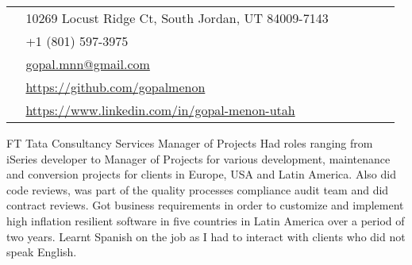 \documentclass[10pt]{article} %
\begin{document}
\begin{paracol}{2}
\switchcolumn %







\parbox[top][0.12\textheight][c]{\linewidth}{ %
	\vspace{-0.04\textheight} %
	\colorbox{shade}{ %
		\begin{supertabular}{p{0.03\linewidth}|p{0.94\linewidth}} %
			\raisebox{-1pt}{\faHome} & 10269 Locust Ridge Ct, South Jordan, UT 84009-7143 \\ %
			\raisebox{-1pt}{\faPhone} & +1 (801) 597-3975 \\ %
			\raisebox{0pt}{\small\faEnvelope} & \href{mailto:gopal.mnn@gmail.com}{gopal.mnn@gmail.com} \\ %
			\raisebox{-1pt}{\small\faDesktop} & \href{https://github.com/gopalmenon}{https://github.com/gopalmenon} \\ %
			\raisebox{-1pt}{\small\faDesktop} & \href{https://www.linkedin.com/in/gopal-menon-utah}{https://www.linkedin.com/in/gopal-menon-utah} \\ %
		\end{supertabular}
	}
}


{FT} %
{Tata Consultancy Services} %
{Manager of Projects} %
{Had roles ranging from iSeries developer to Manager of Projects for various development, maintenance and conversion projects for clients in Europe, USA and Latin America. Also did code reviews, was part of the quality processes compliance audit team and did contract reviews. Got business requirements in order to customize and implement high inflation resilient software in five countries in Latin America over a period of two years. Learnt Spanish on the job as I had to interact with clients who did not speak English.}  %



\end{paracol}
\end{document}
